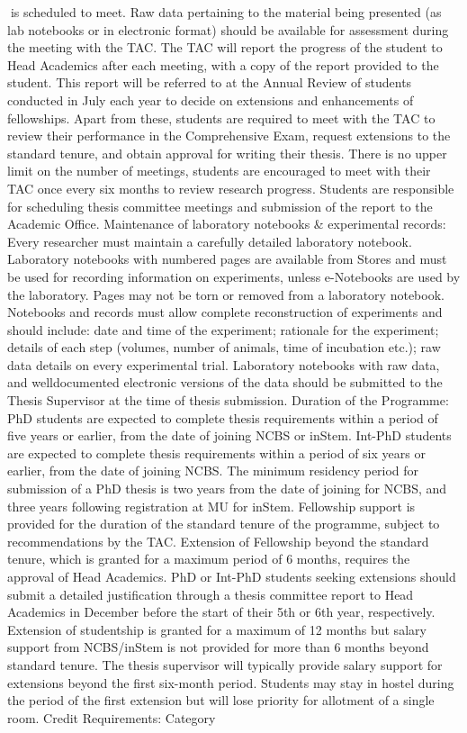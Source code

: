 \documentclass[a4paper,10pt]{article}
\begin{document}
is scheduled to meet. Raw data pertaining to the material being presented (as lab notebooks
or in electronic format) should be available for assessment during the meeting with the
TAC. The TAC will report the progress of the student to Head Academics after each
meeting, with a copy of the report provided to the student. This report will be referred to at
the Annual Review of students conducted in July each year to decide on extensions and
enhancements of fellowships. Apart from these, students are required to meet with the TAC
to review their performance in the Comprehensive Exam, request extensions to the standard
tenure, and obtain approval for writing their thesis. There is no upper limit on the number of
meetings, students are encouraged to meet with their TAC once every six months to review
research progress. Students are responsible for scheduling thesis committee meetings and
submission of the report to the Academic Office.
Maintenance of laboratory notebooks & experimental records: Every researcher must
maintain a carefully detailed laboratory notebook. Laboratory notebooks with numbered
pages are available from Stores and must be used for recording information on experiments,
unless e-Notebooks are used by the laboratory. Pages may not be torn or removed from a
laboratory notebook. Notebooks and records must allow complete reconstruction of
experiments and should include: date and time of the experiment; rationale for the
experiment; details of each step (volumes, number of animals, time of incubation etc.); raw
data details on every experimental trial. Laboratory notebooks with raw data, and welldocumented electronic versions of the data should be submitted to the Thesis Supervisor at
the time of thesis submission.
Duration of the Programme: PhD students are expected to complete thesis requirements
within a period of five years or earlier, from the date of joining NCBS or inStem. Int-PhD
students are expected to complete thesis requirements within a period of six years or earlier,
from the date of joining NCBS. The minimum residency period for submission of a PhD
thesis is two years from the date of joining for NCBS, and three years following registration
at MU for inStem. Fellowship support is provided for the duration of the standard tenure of
the programme, subject to recommendations by the TAC. Extension of Fellowship beyond
the standard tenure, which is granted for a maximum period of 6 months, requires the
approval of Head Academics. PhD or Int-PhD students seeking extensions should submit a
detailed justification through a thesis committee report to Head Academics in December
before the start of their 5th or 6th year, respectively. Extension of studentship is granted for
a maximum of 12 months but salary support from NCBS/inStem is not provided for more
than 6 months beyond standard tenure. The thesis supervisor will typically provide salary
support for extensions beyond the first six-month period. Students may stay in hostel during
the period of the first extension but will lose priority for allotment of a single room.
Credit Requirements:
Category
\end{document}
